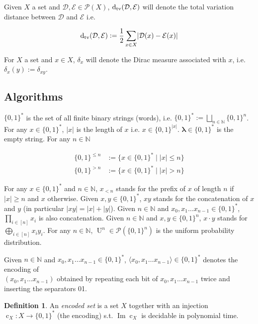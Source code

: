\documentclass{article}
\numberwithin{equation}{section}
\theoremstyle{definition}
\newtheorem{definition}{Definition}[section]
\theoremstyle{plain}
\newcommand{\Bool}{\{0,1\}}
\newcommand{\Words}{{\Bool^*}}
\newcommand{\WordsLen}[1]{{\Bool^{#1}}}
\DeclareMathOperator{\Img}{Im}
\DeclareMathOperator{\Un}{U}
\DeclareMathOperator{\En}{c}
\newcommand{\Dtv}{\operatorname{d}_{\textnormal{tv}}}
\newcommand{\Nats}{\mathbb{N}}
\newcommand{\Estr}{\bm{\lambda}}
\newcommand{\Abs}[1]{\lvert #1 \rvert}
\newcommand{\Chev}[1]{\langle #1 \rangle}
\newcommand{\Dist}{\mathcal{D}}
\begin{document}
Given $X$ a set and $\Dist,\mathcal{E} \in \mathcal{P}(X)$, $\Dtv(\Dist,\mathcal{E})$ will denote the total variation distance between $\Dist$ and $\mathcal{E}$ i.e.

\[\Dtv(\Dist,\mathcal{E}):=\frac{1}{2}\sum_{x \in X} \Abs{\Dist(x) - \mathcal{E}(x)}\]

For $X$ a set and $x \in X$, $\delta_x$ will denote the Dirac measure associated with $x$, i.e. $\delta_x(y):=\delta_{xy}$.

\subsection{Algorithms}

$\Words$ is the set of all finite binary strings (words), i.e. $\Words:=\bigsqcup_{n \in \Nats} \Bool^n$. For any ${x \in \Words}$, $\Abs{x}$ is the length of $x$ i.e. $x \in \WordsLen{\Abs{x}}$. ${\Estr \in \Words}$ is the empty string. For any $n \in \Nats$

\begin{align*}
\Bool^{\leq n}&:=\{x \in \Words \mid \Abs{x} \leq n\} \\
\Bool^{>n}&:=\{x \in \Words \mid \Abs{x} > n\}
\end{align*}

For any $x \in \Words$ and $n \in \Nats$, $x_{< n}$ stands for the prefix of $x$ of length $n$ if $\Abs{x} \geq n$ and $x$ otherwise. Given $x,y \in \Words$, $xy$ stands for the concatenation of $x$ and $y$ (in particular $\Abs{xy}=\Abs{x}+\Abs{y}$). Given ${n \in \Nats}$ and ${x_0, x_1 \ldots x_{n-1} \in \Words}$, ${\prod_{i \in [n]} x_i}$ is also concatenation. Given $n \in \Nats$ and $x,y \in \WordsLen{n}$, $x \cdot y$ stands for $\bigoplus_{i \in [n]} x_i y_i$. For any $n \in \Nats$, $\Un^n \in \mathcal{P}(\WordsLen{n})$ is the uniform probability distribution.

Given $n \in \Nats$ and ${x_0, x_1 \ldots x_{n-1} \in \Words}$, $\Chev{x_0,x_1 \ldots x_{n-1}} \in \Words$ denotes the encoding of\\ $(x_0,x_1 \ldots x_{n-1})$ obtained by repeating each bit of $x_0, x_1 \ldots x_{n-1}$ twice and inserting the separators 01.
\begin{definition}

An \emph{encoded set} is a set $X$ together with an injection ${\En_X: X \rightarrow \Words}$ (the encoding) s.t. $\Img \En_X$ is decidable in polynomial time.

\end{definition}
\end{document}

